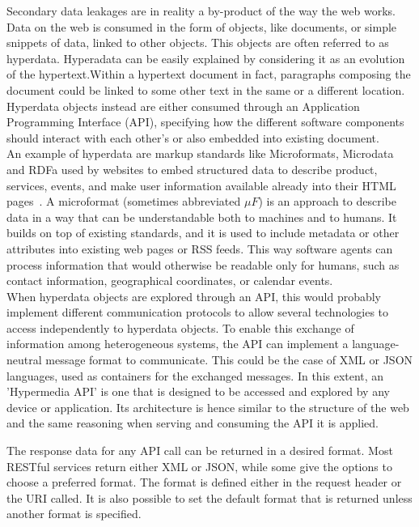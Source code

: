 Secondary data leakages are in reality a by-product of the way the web works. Data on the web is consumed in the form of objects, like documents, or simple snippets of data, linked to other objects. This objects are often referred to as hyperdata. Hyperadata can be easily explained by considering it as an evolution of the hypertext.Within a hypertext document in fact, paragraphs composing the document could be linked to some other text in the same or a different location. Hyperdata objects instead are either consumed through an Application Programming Interface (API), specifying how the different software components should interact with each other's or also embedded into existing document.\\

An example of hyperdata are markup standards like Microformats, Microdata and RDFa used by websites to embed structured data to describe product, services, events, and make user information available already into their HTML pages~\cite{bizer2013deployment}. A microformat (sometimes abbreviated $\mu F$) is an approach to describe data in a way that can be understandable both to machines and to humans. It builds on top of existing standards, and it is used to include metadata or other attributes into existing web pages or RSS feeds. This way software agents can process information that would otherwise be readable only for humans, such as contact information, geographical coordinates, or calendar events.\\

When hyperdata objects are explored through an API, this would probably implement different communication protocols to allow several technologies to access independently to hyperdata objects. To enable this exchange of information among heterogeneous systems, the API can implement a language-neutral message format to communicate. This could be the case of XML or JSON languages, used as containers for the exchanged messages. In this extent, an 'Hypermedia API' is one that is designed to be accessed and explored by any device or application. Its architecture is hence similar to the structure of the web and the same reasoning when serving and consuming the API it is applied. 

The response data for any API call can be returned in a desired format. Most RESTful services return either XML or JSON, while some give the options to choose a preferred format. The format is defined either in the request header or the URI called. It is also possible to set the default format that is returned unless another format is specified.

